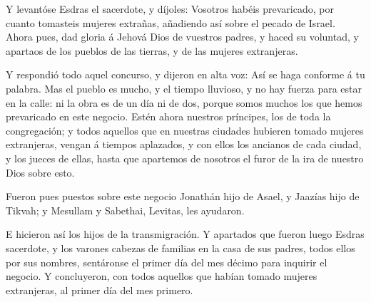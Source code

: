  Y levantóse Esdras el sacerdote, y díjoles: Vosotros
habéis prevaricado, por cuanto tomasteis mujeres extrañas, añadiendo así
sobre el pecado de Israel.  Ahora pues, dad gloria á Jehová
Dios de vuestros padres, y haced su voluntad, y apartaos de los pueblos
de las tierras, y de las mujeres extranjeras.

 Y respondió todo aquel concurso, y dijeron en alta voz:
Así se haga conforme á tu palabra.  Mas el pueblo es mucho,
y el tiempo lluvioso, y no hay fuerza para estar en la calle: ni la obra
es de un día ni de dos, porque somos muchos los que hemos prevaricado en
este negocio.  Estén ahora nuestros príncipes, los de toda
la congregación; y todos aquellos que en nuestras ciudades hubieren
tomado mujeres extranjeras, vengan á tiempos aplazados, y con ellos los
ancianos de cada ciudad, y los jueces de ellas, hasta que apartemos de
nosotros el furor de la ira de nuestro Dios sobre esto.

 Fueron pues puestos sobre este negocio Jonathán hijo de
Asael, y Jaazías hijo de Tikvah; y Mesullam y Sabethai, Levitas, les
ayudaron.

 E hicieron así los hijos de la transmigración. Y apartados
que fueron luego Esdras sacerdote, y los varones cabezas de familias en
la casa de sus padres, todos ellos por sus nombres, sentáronse el primer
día del mes décimo para inquirir el negocio.  Y
concluyeron, con todos aquellos que habían tomado mujeres extranjeras,
al primer día del mes primero.

